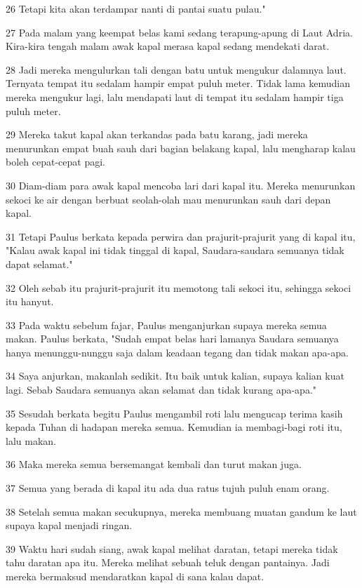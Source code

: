 \par 26 Tetapi kita akan terdampar nanti di pantai suatu pulau."
\par 27 Pada malam yang keempat belas kami sedang terapung-apung di Laut Adria. Kira-kira tengah malam awak kapal merasa kapal sedang mendekati darat.
\par 28 Jadi mereka mengulurkan tali dengan batu untuk mengukur dalamnya laut. Ternyata tempat itu sedalam hampir empat puluh meter. Tidak lama kemudian mereka mengukur lagi, lalu mendapati laut di tempat itu sedalam hampir tiga puluh meter.
\par 29 Mereka takut kapal akan terkandas pada batu karang, jadi mereka menurunkan empat buah sauh dari bagian belakang kapal, lalu mengharap kalau boleh cepat-cepat pagi.
\par 30 Diam-diam para awak kapal mencoba lari dari kapal itu. Mereka menurunkan sekoci ke air dengan berbuat seolah-olah mau menurunkan sauh dari depan kapal.
\par 31 Tetapi Paulus berkata kepada perwira dan prajurit-prajurit yang di kapal itu, "Kalau awak kapal ini tidak tinggal di kapal, Saudara-saudara semuanya tidak dapat selamat."
\par 32 Oleh sebab itu prajurit-prajurit itu memotong tali sekoci itu, sehingga sekoci itu hanyut.
\par 33 Pada waktu sebelum fajar, Paulus menganjurkan supaya mereka semua makan. Paulus berkata, "Sudah empat belas hari lamanya Saudara semuanya hanya menunggu-nunggu saja dalam keadaan tegang dan tidak makan apa-apa.
\par 34 Saya anjurkan, makanlah sedikit. Itu baik untuk kalian, supaya kalian kuat lagi. Sebab Saudara semuanya akan selamat dan tidak kurang apa-apa."
\par 35 Sesudah berkata begitu Paulus mengambil roti lalu mengucap terima kasih kepada Tuhan di hadapan mereka semua. Kemudian ia membagi-bagi roti itu, lalu makan.
\par 36 Maka mereka semua bersemangat kembali dan turut makan juga.
\par 37 Semua yang berada di kapal itu ada dua ratus tujuh puluh enam orang.
\par 38 Setelah semua makan secukupnya, mereka membuang muatan gandum ke laut supaya kapal menjadi ringan.
\par 39 Waktu hari sudah siang, awak kapal melihat daratan, tetapi mereka tidak tahu daratan apa itu. Mereka melihat sebuah teluk dengan pantainya. Jadi mereka bermaksud mendaratkan kapal di sana kalau dapat.
